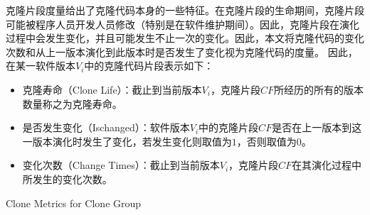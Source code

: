 克隆片段度量给出了克隆代码本身的一些特征。在克隆片段的生命期间，克隆片段可能被程序人员开发人员修改（特别是在软件维护期间）。因此，克隆片段在演化过程中会发生变化，并且可能发生不止一次的变化。因此，本文将克隆代码的变化次数和从上一版本演化到此版本时是否发生了变化视为克隆代码的度量。 因此，在某一软件版本$V_ i $中的克隆代码片段表示如下：
\begin{itemize}
\item
克隆寿命（Clone Life）：截止到当前版本$V_ i $，克隆片段$CF$所经历的所有的版本数量称之为克隆寿命。
\item
是否发生变化（Ischanged）：软件版本$V_ i $中的克隆片段$CF$是否在上一版本到这一版本演化时发生了变化，若发生变化则取值为$1$，否则取值为$0$。
\item
变化次数（Change Times）：截止到当前版本$V_ i $，克隆片段$CF$在其演化过程中所发生的变化次数。
\end{itemize}

{Clone Metrics for Clone Group}

